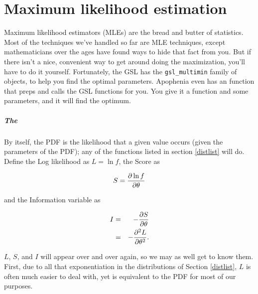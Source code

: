 \chapter{Maximum likelihood estimation} \label{mle}

Maximum likelihood estimators (MLEs) are the bread and butter of
statistics. Most of the techniques we've handled so far are MLE
techniques, except mathematicians over the ages have found ways to hide
that fact from you. But if there isn't a nice, convenient way to get
around doing the maximization, you'll have to do it yourself. Fortunately,
the GSL has the {\tt gsl\_multimin} family of objects, to help you find
the optimal parameters. Apophenia even has an 
function that preps and calls the GSL functions for you. You give it a
function and some parameters, and it will find the optimum.


\paragraph{The }	\label{the score}
By itself, the PDF is the likelihood that a given value occurs (given
the parameters of the PDF); any of the functions listed in section
\ref{distlist} will do. Define the Log likelihood as $L=\ln f$, the
Score as

$$S={\partial \ln f\over \partial \theta}$$ 

and the Information variable as

\begin{eqnarray}
I&=&-{\partial S \over \partial \theta}			\nonumber\\
&=&-{\partial^2 L \over \partial \theta^2}.		\nonumber
\end{eqnarray}

$L$, $S$, and $I$ will appear over and over again, so we may as well get
to know them. First, due to all that exponentiation in the distributions
of Section \ref{distlist}, $L$ is often much easier to deal with, yet
is equivalent to the PDF for most of our purposes. 

